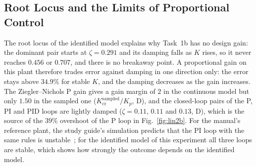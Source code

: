 \documentclass[lettersize,journal]{IEEEtran}
\newcommand{\Kcr}{K_{\mathrm{cr}}}
\begin{document}
\subsection{Root Locus and the Limits of Proportional Control}
The root locus of the identified model explains why Task~1b has no design gain: the dominant pair starts at $\zeta=0.291$ and its damping falls as $K$ rises, so it never reaches $0.456$ or $0.707$, and there is no breakaway point. A proportional gain on this plant therefore trades error against damping in one direction only: the error stays above $34.9\%$ for stable $K$, and the damping decreases as the gain increases. The Ziegler--Nichols P gain gives a gain margin of $2$ in the continuous model but only $1.50$ in the sampled one ($\Kcr^{\mathrm{sampled}}/K_p$, D), and the closed-loop pairs of the P, PI and PID loops are lightly damped ($\zeta=0.11$, $0.11$ and $0.13$, D), which is the source of the $39\%$ overshoot of the P loop in Fig.~\ref{fig:lin2b}. For the manual's reference plant, the study guide's simulation predicts that the PI loop with the same rules is unstable~\cite{studyguide}; for the identified model of this experiment all three loops are stable, which shows how strongly the outcome depends on the identified model.
\end{document}
